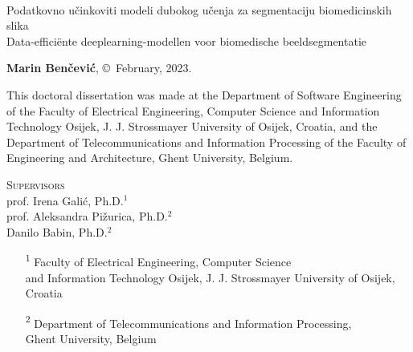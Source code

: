 \documentclass[
  11pt, %
  oneside, %
  english, %
  singlespacing, %
  liststotoc, %
  headsepline, %
  chapterinoneline, %
]{MastersDoctoralThesis} %
\newcommand{\ttitlenl}[0]{Data-efficiënte deeplearning-modellen voor biomedische beeldsegmentatie}
\newcommand{\ttitlehr}[0]{Podatkovno učinkoviti modeli dubokog učenja za segmentaciju biomedicinskih slika}
\begin{document}
\frontmatter %

\pagestyle{plain} %

\sloppy




\clearpage

{\setlength{\parindent}{0cm}
{\Large \ttitle\\[1em]}
{\Large \ttitlehr\\[1em]}
{\Large \ttitlenl\\[1em]}
}

\textbf{Marin Benčević}, \copyright~February, 2023.

\vfill
\vfill

This doctoral dissertation was made at the Department of Software Engineering of the Faculty of Electrical Engineering, Computer Science and Information Technology Osijek, J. J. Strossmayer University of Osijek, Croatia, and the Department of Telecommunications and Information Processing of the Faculty of Engineering and Architecture, Ghent University, Belgium.

\vfill

{\setlength{\parindent}{0cm}
\textsc{Supervisors}\\[0.35em]

prof. Irena Galić, Ph.D.$^1$\\
prof. Aleksandra Pižurica, Ph.D.$^2$\\
Danilo Babin, Ph.D.$^2$\\

\begin{enumerate}[leftmargin=*]
	\item[{\expandafter\textsuperscript 1}] Faculty of Electrical Engineering, Computer Science\\and Information Technology Osijek, J. J. Strossmayer University of Osijek, Croatia
	\item[{\expandafter\textsuperscript 2}] Department of Telecommunications and Information Processing,\\ Ghent University, Belgium
\end{enumerate}
}

\clearpage
\end{document}
